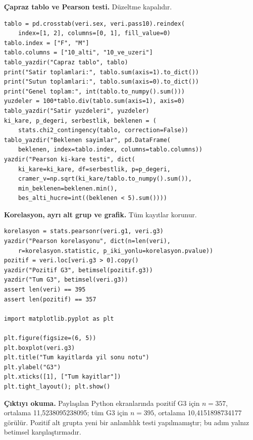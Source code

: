 \par\noindent\begin{minipage}{\linewidth}
\textbf{Çapraz tablo ve Pearson testi.} Düzeltme kapalıdır.

\begin{lstlisting}[style=prismPythonApp]
tablo = pd.crosstab(veri.sex, veri.pass10).reindex(
    index=[1, 2], columns=[0, 1], fill_value=0)
tablo.index = ["F", "M"]
tablo.columns = ["10_alti", "10_ve_uzeri"]
tablo_yazdir("Capraz tablo", tablo)
print("Satir toplamlari:", tablo.sum(axis=1).to_dict())
print("Sutun toplamlari:", tablo.sum(axis=0).to_dict())
print("Genel toplam:", int(tablo.to_numpy().sum()))
yuzdeler = 100*tablo.div(tablo.sum(axis=1), axis=0)
tablo_yazdir("Satir yuzdeleri", yuzdeler)
ki_kare, p_degeri, serbestlik, beklenen = (
    stats.chi2_contingency(tablo, correction=False))
tablo_yazdir("Beklenen sayimlar", pd.DataFrame(
    beklenen, index=tablo.index, columns=tablo.columns))
yazdir("Pearson ki-kare testi", dict(
    ki_kare=ki_kare, df=serbestlik, p=p_degeri,
    cramer_v=np.sqrt(ki_kare/tablo.to_numpy().sum()),
    min_beklenen=beklenen.min(),
    bes_alti_hucre=int((beklenen < 5).sum())))
\end{lstlisting}
\end{minipage}\par

\par\noindent\begin{minipage}{\linewidth}
\textbf{Korelasyon, ayrı alt grup ve grafik.} Tüm kayıtlar korunur.

\begin{lstlisting}[style=prismPythonApp]
korelasyon = stats.pearsonr(veri.g1, veri.g3)
yazdir("Pearson korelasyonu", dict(n=len(veri),
    r=korelasyon.statistic, p_iki_yonlu=korelasyon.pvalue))
pozitif = veri.loc[veri.g3 > 0].copy()
yazdir("Pozitif G3", betimsel(pozitif.g3))
yazdir("Tum G3", betimsel(veri.g3))
assert len(veri) == 395
assert len(pozitif) == 357

import matplotlib.pyplot as plt

plt.figure(figsize=(6, 5))
plt.boxplot(veri.g3)
plt.title("Tum kayitlarda yil sonu notu")
plt.ylabel("G3")
plt.xticks([1], ["Tum kayitlar"])
plt.tight_layout(); plt.show()
\end{lstlisting}

\textbf{Çıktıyı okuma.} Paylaşılan Python ekranlarında pozitif G3
için $n=357$, ortalama 11,5238095238095; tüm G3 için $n=395$,
ortalama 10,4151898734177 görülür. Pozitif alt grupta yeni bir
anlamlılık testi yapılmamıştır; bu adım yalnız betimsel karşılaştırmadır.
\end{minipage}\par

